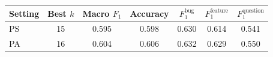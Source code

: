 \begin{tabular}{lcccccc}
  \toprule
  Setting & Best $k$ & Macro $F_1$ & Accuracy & $F_1^{\text{bug}}$ & $F_1^{\text{feature}}$ & $F_1^{\text{question}}$ \\
  \midrule
  PS & 15 & 0.595 & 0.598 & 0.630 & 0.614 & 0.541 \\
  PA & 16 & 0.604 & 0.606 & 0.632 & 0.629 & 0.550 \\
  \bottomrule
\end{tabular}
